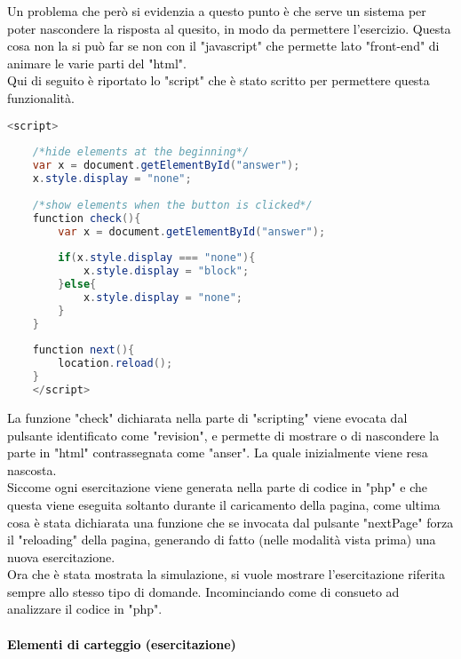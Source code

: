 \textcolor{black}{Un problema che però si evidenzia a questo punto è che serve un sistema per poter nascondere la risposta al quesito, in modo da permettere l'esercizio. Questa cosa non la si può far se non con il "javascript" che permette lato "front-end" di animare le varie parti del "html".\\
Qui di seguito è riportato lo "script" che è stato scritto per permettere questa funzionalità.}\\

\begin{lstlisting}[language=java]
	<script>
	
	/*hide elements at the beginning*/
	var x = document.getElementById("answer");
	x.style.display = "none";
	
	/*show elements when the button is clicked*/
	function check(){
		var x = document.getElementById("answer");
		
		if(x.style.display === "none"){
			x.style.display = "block";
		}else{
			x.style.display = "none";
		}	
	}
	
	function next(){
		location.reload();  
	}
	</script>
\end{lstlisting}

\textcolor{black}{La funzione "check" dichiarata nella parte di "scripting" viene evocata dal pulsante identificato come "revision", e permette di mostrare o di nascondere la parte in "html" contrassegnata come "anser". La quale inizialmente viene resa nascosta.\\
Siccome ogni esercitazione viene generata nella parte di codice in "php" e che questa viene eseguita soltanto durante il caricamento della pagina, come ultima cosa è stata dichiarata una funzione che se invocata dal pulsante "nextPage" forza il "reloading" della pagina, generando di fatto (nelle modalità vista prima) una nuova esercitazione.}\\

\textcolor{black}{Ora che è stata mostrata la simulazione, si vuole mostrare l'esercitazione riferita sempre allo stesso tipo di domande. Incominciando come di consueto ad analizzare il codice in "php"}.
\paragraph{\textcolor{black}{Elementi di carteggio (esercitazione)}}\leavevmode\\

